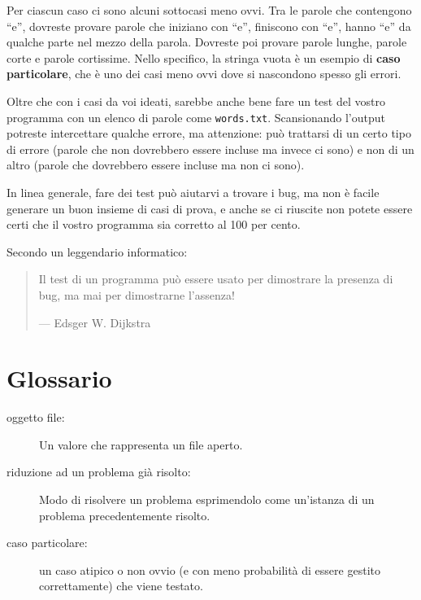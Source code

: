 \documentclass[10pt]{book}
\begin{document}
Per ciascun caso ci sono alcuni sottocasi meno ovvi. Tra le parole che contengono ``e'', dovreste provare parole che iniziano con ``e'', finiscono con ``e'', hanno ``e'' da qualche parte nel mezzo della parola. Dovreste poi provare parole lunghe, parole corte e parole cortissime. Nello specifico, la stringa vuota è un esempio di {\bf caso particolare}, che è uno dei casi meno ovvi dove si nascondono spesso gli errori.

Oltre che con i casi da voi ideati, sarebbe anche bene fare un test del vostro programma con un elenco di parole come {\tt words.txt}.  Scansionando l'output potreste intercettare qualche errore, ma attenzione: può trattarsi di un certo tipo di errore (parole che non dovrebbero essere incluse ma invece ci sono) e non di un altro (parole che dovrebbero essere incluse ma non ci sono).

In linea generale, fare dei test può aiutarvi a trovare i bug, ma non è facile generare un buon insieme di casi di prova, e anche se ci riuscite non potete essere certi che il vostro programma sia corretto al 100 per cento.

Secondo un leggendario informatico:

\begin{quote}
Il test di un programma può essere usato per dimostrare la presenza di bug, ma mai per dimostrarne l'assenza!

--- Edsger W. Dijkstra
\end{quote}


\section{Glossario}

\begin{description}

\item[oggetto file:] Un valore che rappresenta un file aperto.

\item[riduzione ad un problema già risolto:] Modo di risolvere un problema esprimendolo come un'istanza di un problema precedentemente risolto.

\item[caso particolare:] un caso atipico o non ovvio (e con meno probabilità di essere gestito correttamente) che viene testato.

\end{description}
\end{document}
